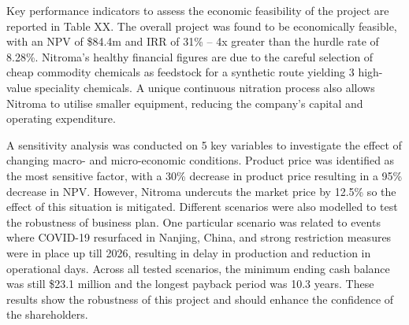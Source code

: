 Key performance indicators to assess the economic feasibility of the project are reported in Table XX. The overall project was found to be economically feasible, with an NPV of \$84.4m and IRR of 31\% – 4x greater than the hurdle rate of 8.28\%. Nitroma’s healthy financial figures are due to the careful selection of cheap commodity chemicals as feedstock for a synthetic route yielding 3 high-value speciality chemicals. A unique continuous nitration process also allows Nitroma to utilise smaller equipment, reducing the company’s capital and operating expenditure.

A sensitivity analysis was conducted on 5 key variables to investigate the effect of changing macro- and micro-economic conditions. Product price was identified as the most sensitive factor, with a 30\% decrease in product price resulting in a 95\% decrease in NPV. However, Nitroma undercuts the market price by 12.5\% so the effect of this situation is mitigated. Different scenarios were also modelled to test the robustness of business plan. One particular scenario was related to events where COVID-19 resurfaced in Nanjing, China, and strong restriction measures were in place up till 2026, resulting in delay in production and reduction in operational days. Across all tested scenarios, the minimum ending cash balance was still \$23.1 million and the longest payback period was 10.3 years. These results show the robustness of this project and should enhance the confidence of the shareholders.